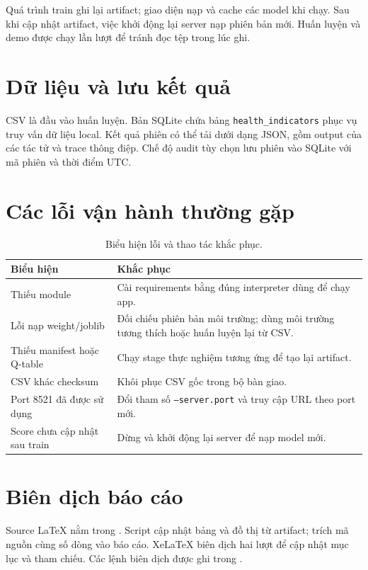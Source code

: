 Quá trình train ghi lại artifact; giao diện nạp và cache các model khi chạy. Sau khi cập nhật artifact, việc khởi động lại server nạp phiên bản mới. Huấn luyện và demo được chạy lần lượt để tránh đọc tệp trong lúc ghi.

\section{Dữ liệu và lưu kết quả}
CSV là đầu vào huấn luyện. Bản SQLite chứa bảng \texttt{health\_indicators} phục vụ truy vấn dữ liệu local. Kết quả phiên có thể tải dưới dạng JSON, gồm output của các tác tử và trace thông điệp. Chế độ audit tùy chọn lưu phiên vào SQLite với mã phiên và thời điểm UTC.

\section{Các lỗi vận hành thường gặp}
\begin{table}[H]\centering\small
\caption{Biểu hiện lỗi và thao tác khắc phục.}
\begin{tabularx}{\textwidth}{@{}p{4cm}Y@{}}\toprule
Biểu hiện & Khắc phục \\\midrule
Thiếu module & Cài requirements bằng đúng interpreter dùng để chạy app. \\
Lỗi nạp weight/joblib & Đối chiếu phiên bản môi trường; dùng môi trường tương thích hoặc huấn luyện lại từ CSV. \\
Thiếu manifest hoặc Q-table & Chạy stage thực nghiệm tương ứng để tạo lại artifact. \\
CSV khác checksum & Khôi phục CSV gốc trong bộ bàn giao. \\
Port 8521 đã được sử dụng & Đổi tham số \texttt{--server.port} và truy cập URL theo port mới. \\
Score chưa cập nhật sau train & Dừng và khởi động lại server để nạp model mới. \\\bottomrule
\end{tabularx}
\end{table}

\section{Biên dịch báo cáo}
Source LaTeX nằm trong . Script  cập nhật bảng và đồ thị từ artifact;  trích mã nguồn cùng số dòng vào báo cáo. XeLaTeX biên dịch hai lượt để cập nhật mục lục và tham chiếu. Các lệnh biên dịch được ghi trong .
